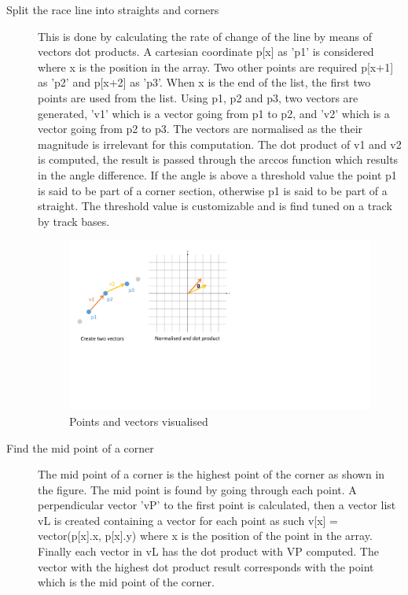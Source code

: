 \begin{description}
	\item [Split the race line into straights and corners] This is done by calculating the rate of change of the line by means of vectors dot products. A cartesian coordinate p[x] as 'p1' is considered where x is the position in the array. Two other points are required p[x+1] as 'p2' and p[x+2] as 'p3'. When x is the end of the list, the first two points are used from the list. Using p1, p2 and p3, two vectors are generated, 'v1' which is a vector going from p1 to p2, and 'v2' which is a vector going from p2 to p3. The vectors are normalised as the their magnitude is irrelevant for this computation. The dot product of v1 and v2 is computed, the result is passed through the arccos function which results in the angle difference. If the angle is above a threshold value the point p1 is said to be part of a corner section, otherwise p1 is said to be part of a straight. The threshold value is customizable and is find tuned on a track by track bases.
	
	\begin{figure}[!htb]
		\centering
		\includegraphics[width=\textwidth]{diagrams/vectorCorners.pdf}
		\caption[Splicing using vectors]{Points and vectors visualised}
		\label{fig:diagram-vectorCorners}
	\end{figure}
	
	\item [Find the mid point of a corner] The mid point of a corner is the highest point of the corner as shown in the figure. The mid point is found by going through each point. A perpendicular vector 'vP' to the first point is calculated, then a vector list vL is created containing a vector for each point as such v[x] = vector(p[x].x, p[x].y) where x is the position of the point in the array. Finally each vector in vL has the dot product with VP computed. The vector with the highest dot product result corresponds with the point which is the mid point of the corner.
	

\end{description}
